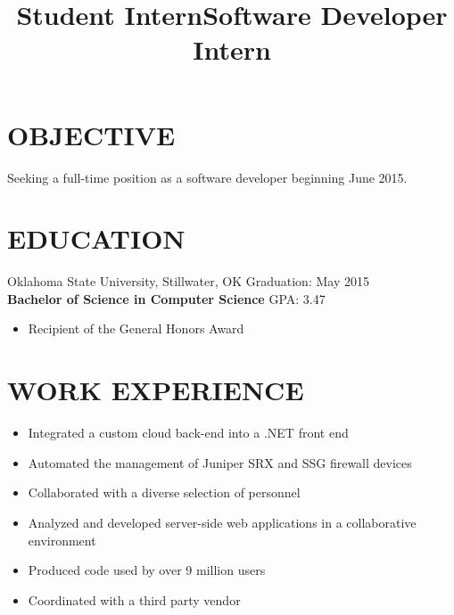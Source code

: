 \documentclass[line, overlapped]{res}
\begin{document}
\address{1875 Arbor Valley Dr \\ Edmond, OK 73025 \\ (405) 598-7827 \\ brandon@brandonsilver.com}

\begin{resume}
    \section{OBJECTIVE}
    
    Seeking a full-time position as a software developer beginning June 2015.

    \section{EDUCATION}

    Oklahoma State University, Stillwater, OK \hfill Graduation: May 2015 \\
    \textbf{Bachelor of Science in Computer Science} \hfill GPA: 3.47
    \begin{itemize}
        \item Recipient of the General Honors Award
    \end{itemize}


	\section{WORK EXPERIENCE} 

    \title{Student Intern}
    \begin{position}
        \begin{itemize}
            \item Integrated a custom cloud back-end into a .NET front end
            \item Automated the management of Juniper SRX and SSG firewall devices
            \item Collaborated with a diverse selection of personnel
    \end{itemize}
    \end{position}

    \title{Software Developer Intern}
    \begin{position}
        \begin{itemize}
            \item Analyzed and developed server-side web applications in a collaborative environment
            \item Produced code used by over 9 million users
            \item Coordinated with a third party vendor
    \end{itemize}
    \end{position} 


\end{resume}
\end{document}
